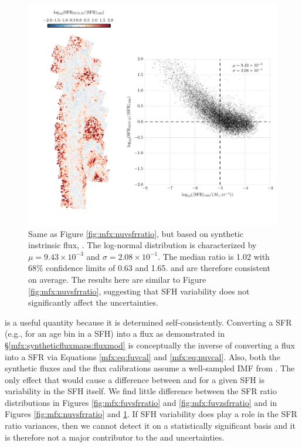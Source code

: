 \begin{figure}
\centering
\includegraphics[width=\textwidth]{m31flux-figures/sfr_nuv0-vs-mean.pdf}
\caption[Ratio of the \sfr{} based on the synthetic intrinsic \nuv{} flux to
the $100\myr$ mean \sfr{}.]{Same as Figure \ref{fig:mfx:nuvsfrratio}, but based
    on synthetic instrinsic flux, \sfrnuvz{}. The log-normal distribution is
    characterized by $\mu = 9.43\times 10^{-3}$ and $\sigma = 2.08\times
    10^{-1}$. The median ratio is 1.02 with 68\% confidence limits of 0.63 and
    1.65. \sfrnuvz{} and \sfroneh{} are therefore consistent on average. The
    results here are similar to Figure \ref{fig:mfx:nuvsfrratio}, suggesting
    that SFH variability does not significantly affect the \sfrnuv{}
    uncertainties.
}
\label{fig:mfx:nuvzsfrratio}
\end{figure}


\sfrxz{} is a useful quantity because it is determined self-consistently.
Converting a SFR (e.g., for an age bin in a SFH) into a flux as demonstrated in
\S \ref{mfx:syntheticfluxmaps:fluxmod} is conceptually the inverse of
converting a flux into a SFR via Equations \ref{mfx:eq:fuvcal} and
\ref{mfx:eq:nuvcal}. Also, both the synthetic fluxes and the flux calibrations
assume a well-sampled IMF from \citet{Kroupa:2001}. The only effect that would
cause a difference between \sfroneh{} and \sfrxz{} for a given SFH is
variability in the SFH itself. We find little difference between the SFR ratio
distributions in Figures \ref{fig:mfx:fuvsfrratio} and
\ref{fig:mfx:fuvzsfrratio} and in Figures \ref{fig:mfx:nuvsfrratio} and
\ref{fig:mfx:nuvzsfrratio}. If SFH variability does play a role in the SFR
ratio variances, then we cannot detect it on a statistically significant basis
and it is therefore not a major contributor to the \sfrx{} and \sfrxz{}
uncertainties.

